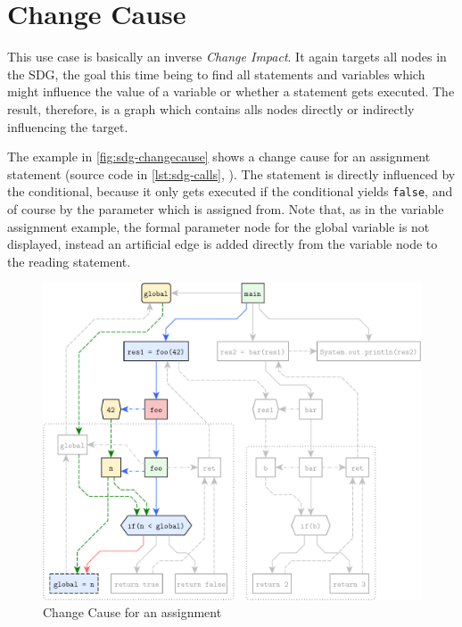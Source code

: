

\section{Change Cause}

This use case is basically an inverse \emph{Change Impact}. It again targets all nodes in the SDG, the goal this time 
being to find all statements and variables which might influence the value of a variable or whether a statement gets 
executed. The result, therefore, is a graph which contains alls nodes directly or indirectly influencing the target.

The example in \autoref{fig:sdg-changecause} shows a change cause for an assignment statement (source code in 
\autoref{lst:sdg-calls}, ). The statement is directly influenced by the conditional, because 
it only gets executed if the conditional yields \lstinline|false|, and of course by the parameter which is assigned 
from. Note that, as in the variable assignment example, the formal parameter node for the global variable is not 
displayed, instead an artificial edge is added directly from the variable node to the reading statement.

\begin{figure}[hp]
  \centering
    \includegraphics[scale=0.6]{sdgs/changecause}
  \caption{Change Cause for an assignment}
  \label{fig:sdg-changecause}
\end{figure}
